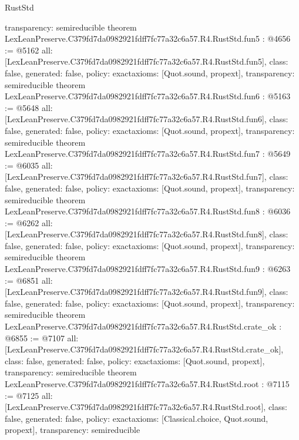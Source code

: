 \begin{lexlean}{RustStd}
\begin{coremodule}
{  transparency: semireducible
}
theorem LexLeanPreserve.C379fd7da0982921fdff7fc77a32c6a57.R4.RustStd.fun5 : @4656 := @5162 {
  all: [LexLeanPreserve.C379fd7da0982921fdff7fc77a32c6a57.R4.RustStd.fun5],
  class: false,
  generated: false,
  policy: exact{axioms: [Quot.sound, propext]},
  transparency: semireducible
}
theorem LexLeanPreserve.C379fd7da0982921fdff7fc77a32c6a57.R4.RustStd.fun6 : @5163 := @5648 {
  all: [LexLeanPreserve.C379fd7da0982921fdff7fc77a32c6a57.R4.RustStd.fun6],
  class: false,
  generated: false,
  policy: exact{axioms: [Quot.sound, propext]},
  transparency: semireducible
}
theorem LexLeanPreserve.C379fd7da0982921fdff7fc77a32c6a57.R4.RustStd.fun7 : @5649 := @6035 {
  all: [LexLeanPreserve.C379fd7da0982921fdff7fc77a32c6a57.R4.RustStd.fun7],
  class: false,
  generated: false,
  policy: exact{axioms: [Quot.sound, propext]},
  transparency: semireducible
}
theorem LexLeanPreserve.C379fd7da0982921fdff7fc77a32c6a57.R4.RustStd.fun8 : @6036 := @6262 {
  all: [LexLeanPreserve.C379fd7da0982921fdff7fc77a32c6a57.R4.RustStd.fun8],
  class: false,
  generated: false,
  policy: exact{axioms: [Quot.sound, propext]},
  transparency: semireducible
}
theorem LexLeanPreserve.C379fd7da0982921fdff7fc77a32c6a57.R4.RustStd.fun9 : @6263 := @6851 {
  all: [LexLeanPreserve.C379fd7da0982921fdff7fc77a32c6a57.R4.RustStd.fun9],
  class: false,
  generated: false,
  policy: exact{axioms: [Quot.sound, propext]},
  transparency: semireducible
}
theorem LexLeanPreserve.C379fd7da0982921fdff7fc77a32c6a57.R4.RustStd.crate_ok : @6855 := @7107 {
  all: [LexLeanPreserve.C379fd7da0982921fdff7fc77a32c6a57.R4.RustStd.crate_ok],
  class: false,
  generated: false,
  policy: exact{axioms: [Quot.sound, propext]},
  transparency: semireducible
}
theorem LexLeanPreserve.C379fd7da0982921fdff7fc77a32c6a57.R4.RustStd.root : @7115 := @7125 {
  all: [LexLeanPreserve.C379fd7da0982921fdff7fc77a32c6a57.R4.RustStd.root],
  class: false,
  generated: false,
  policy: exact{axioms: [Classical.choice, Quot.sound, propext]},
  transparency: semireducible
}


\end{coremodule}
\end{lexlean}
